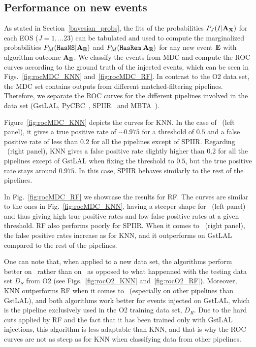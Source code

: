 \subsection{Performance on new events}

As stated in Section~\ref{bayesian_probs}, the fits of the probabilities $P_J(I|{\bf A}_{\bf X})$ for each EOS ($J=1,\dots 23$) can be tabulated and used to compute the marginalized
probabilities $P_M({{\tt HasNS}}|{\bf A}_{\bf E})$ and $P_M({{\tt HasRem}}|{\bf A}_{\bf E})$ for any new event $\bf E$ with algorithm outcome $\bf A_{E}$.  We classify the events from MDC and compute the ROC
curves according to the ground truth of the injected events, which can be seen in Figs.~\ref{fig:rocMDC_KNN} and~\ref{fig:rocMDC_RF}. In contrast to the \ac{O2} data set, the \ac{MDC} set contains
outputs from different matched-filtering pipelines. Therefore, we separate the ROC curves for the different pipelines involved in the data set (GstLAL,  PyCBC~\cite{Usman:2015kfa}, SPIIR~\cite{Chu:2020pjv} and
MBTA~\cite{Adams:2015ulm}). 


Figure~\ref{fig:rocMDC_KNN} depicts the curves for \ac{KNN}.  In the case of
\hasns\ (left panel), it gives a true positive rate of $\sim 0.975$ for a
threshold of $0.5$ and a false positive rate of less than $0.2$ for all the
pipelines except of SPIIR. Regarding \hasrem\ (right panel), \ac{KNN} gives a
false positive rate slightly higher than $0.2$ for all the pipelines except of
GstLAL when fixing the threshold to $0.5$, but the true positive rate stays
around $0.975$. In this case, SPIIR behaves similarly to the rest of the pipelines. 

In Fig.~\ref{fig:rocMDC_RF} we showcase the results for \ac{RF}.  The curves
are similar to the ones in Fig.~\ref{fig:rocMDC_KNN}, having a steeper shape for \hasns\ (left panel) and thus giving high true positive rates and low false positive rates at a given threshold. \ac{RF} also performs poorly for SPIIR. When it comes to \hasrem\ (right panel), the false positive rates increase as for \ac{KNN}, and it outperforms on GstLAL compared to the rest of the pipelines.  

One can note that, when applied to a new data set, the algorithms perform better on \hasns\ rather than on \hasrem\, as opposed to what happenned with the testing data set $D_S$ from O2 (see Figs.~\ref{fig:rocO2_KNN} and~\ref{fig:rocO2_RF}). Moreover, \ac{KNN} outperforms \ac{RF} when it comes to \hasrem\ (especially on other pipelines than GstLAL), and both algorithms work better for events injected on GstLAL, which is the pipeline exclusively used in the O2 training data set, $D_R$. Due to the hard cuts applied by \ac{RF} and the fact that it has been trained only with GstLAL injections, this algorithm is less adaptable than \ac{KNN}, and that is why the ROC curves are not as steep as for \ac{KNN} when classifying data from other pipelines. 

